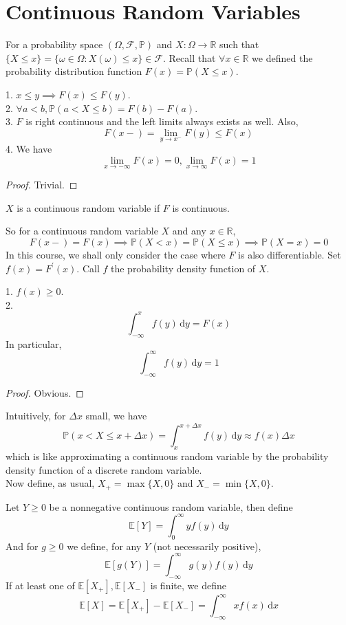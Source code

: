 \section{Continuous Random Variables}
For a probability space $(\Omega,\mathscr F,\mathbb P)$ and $X:\Omega\to\mathbb R$ such that $\{X\le x\}=\{\omega\in\Omega:X(\omega)\le x\}\in\mathscr F$.
Recall that $\forall x\in\mathbb R$ we defined the probability distribution function $F(x)=\mathbb P(X\le x)$.
\begin{proposition}
    1. $x\le y\implies F(x)\le F(y)$.\\
    2. $\forall a<b,\mathbb P(a<X\le b)=F(b)-F(a)$.\\
    3. $F$ is right continuous and the left limits always exists as well.
    Also,
    $$F(x-)=\lim_{y\to x^-}F(y)\le F(x)$$
    4. We have
    $$\lim_{x\to-\infty}F(x)=0,\lim_{x\to\infty}F(x)=1$$
\end{proposition}
\begin{proof}
    Trivial.
\end{proof}
\begin{definition}
    $X$ is a continuous random variable if $F$ is continuous.
\end{definition}
So for a continuous random variable $X$ and any $x\in\mathbb R$,
$$F(x-)=F(x)\implies\mathbb P(X<x)=\mathbb P(X\le x)\implies\mathbb P(X=x)=0$$
In this course, we shall only consider the case where $F$ is also differentiable.
Set $f(x)=F^\prime(x)$.
Call $f$ the probability density function of $X$.
\begin{proposition}
    1. $f(x)\ge 0$.\\
    2.
    $$\int_{-\infty}^x f(y)\,\mathrm dy=F(x)$$
    In particular,
    $$\int_{-\infty}^\infty f(y)\,\mathrm dy=1$$
\end{proposition}
\begin{proof}
    Obvious.
\end{proof}
Intuitively, for $\Delta x$ small, we have
$$\mathbb P(x<X\le x+\Delta x)=\int_x^{x+\Delta x}f(y)\,\mathrm dy\approx f(x)\Delta x$$
which is like approximating a continuous random variable by the probability density function of a discrete random variable.\\
Now define, as usual, $X_+=\max\{X,0\}$ and $X_-=\min\{X,0\}$.
\begin{definition}
    Let $Y\ge 0$ be a nonnegative continuous random variable, then define
    $$\mathbb E[Y]=\int_0^\infty yf(y)\,\mathrm dy$$
    And for $g\ge 0$ we define, for any $Y$ (not necessarily positive),
    $$\mathbb E[g(Y)]=\int_{-\infty}^\infty g(y)f(y)\,\mathrm dy$$
    If at least one of $\mathbb E[X_+],\mathbb E[X_-]$ is finite, we define
    $$\mathbb E[X]=\mathbb E[X_+]-\mathbb E[X_-]=\int_{-\infty}^\infty xf(x)\,\mathrm dx$$
\end{definition}
